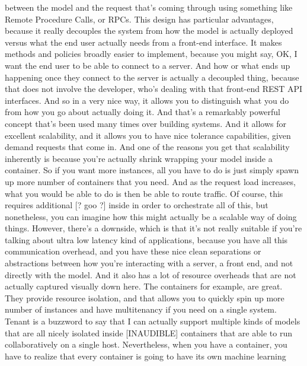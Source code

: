 {{{{{{{     between the model and the request that's coming through using something
     like Remote Procedure Calls, or RPCs.
     This design has particular advantages, because it really
     decouples the system from how the model is actually deployed
     versus what the end user actually needs from a front-end interface.
     It makes methods and policies broadly easier to implement,
     because you might say, OK, I want the end
     user to be able to connect to a server.
     And how or what ends up happening once they connect to the server
     is actually a decoupled thing, because that does not
     involve the developer, who's dealing with that front-end REST API
     interfaces.
     And so in a very nice way, it allows you to distinguish
     what you do from how you go about actually doing it.
     And that's a remarkably powerful concept that's been used many times
     over building systems.
     And it allows for excellent scalability, and it
     allows you to have nice tolerance capabilities,
     given demand requests that come in.
     And one of the reasons you get that scalability inherently
     is because you're actually shrink wrapping your model inside a container.
     So if you want more instances, all you have to do is just simply spawn up
     more number of containers that you need.
     And as the request load increases, what you would be able to do
     is then be able to route traffic.
     Of course, this requires additional [? goo ?] inside
     in order to orchestrate all of this, but nonetheless, you
     can imagine how this might actually be a scalable way of doing things.
     However, there's a downside, which is that it's not really suitable if you're
     talking about ultra low latency kind of applications,
     because you have all this communication overhead,
     and you have these nice clean separations or abstractions
     between how you're interacting with a server, a front end,
     and not directly with the model.
     And it also has a lot of resource overheads
     that are not actually captured visually down here.
     The containers for example, are great.
     They provide resource isolation, and that
     allows you to quickly spin up more number of instances
     and have multitenancy if you need on a single system.
     Tenant is a buzzword to say that I can actually
     support multiple kinds of models that are all nicely isolated
     inside [INAUDIBLE] containers that are able to run collaboratively
     on a single host.
     Nevertheless, when you have a container, you
     have to realize that every container is going to have its own machine learning
}}}}}}}
